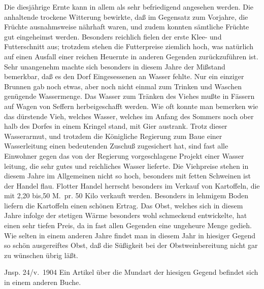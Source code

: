 

\pstart
Die diesjährige Ernte kann in allem als sehr\ob
befriedigend angesehen werden. Die anhaltende\ob
trockene Witterung bewirkte, daß im Gegensatz\ob
zum Vorjahre, die Früchte ausnahmsweise nährhaft\ob
waren, und zudem konnten sämtliche Früchte\ob
gut eingeheimst werden. Besonders reichlich fielen\ob
der erste Klee- und Futterschnitt aus; trotzdem\ob
stehen die Futterpreise ziemlich hoch, was natürlich\ob
auf einen Ausfall einer reichen Heuernte in\ob
anderen Gegenden zurückzuführen ist. Sehr\ob
unangenehm machte sich besonders in diesem\ob
Jahre der Mißstand bemerkbar, daß es den Dorf\ohb
Eingesessenen an Wasser fehlte. Nur ein\ob
einziger Brunnen gab noch etwas, aber noch\ob
nicht einmal zum Trinken und Waschen genügende\ob
Wassermenge. Das Wasser zum Tränken des Viehes\ob
mußte in Fässern auf Wagen von Seffern\ob
herbeigeschafft werden. Wie oft konnte man\ob
bemerken wie das dürstende Vieh, welches\ob
Wasser, welches im Anfang des Sommers noch ober\ohb
halb des Dorfes in einem Kringel stand, mit\ob
Gier austrank. Trotz dieser Wasserarmut, und trotzdem\ob
die Königliche Regierung zum Baue einer\ob
Wasserleitung einen bedeutenden Zuschuß zugesichert\ob
hat, sind fast alle Einwohner gegen das von\ob
der Regierung vorgeschlagene Projekt einer Wasser\ohb
leitung, die sehr gutes und reichliches Wasser lieferte.\ob
Die Viehpreise stehen in diesem Jahre im Allgemeinen\ob
nicht so hoch, besonders mit fetten Schweinen ist\ob
der Handel flau. Flotter Handel herrscht besonders\ob
im Verkauf von Kartoffeln, die mit 2,20 bis,50 M.\ pr. 50 Kilo verkauft werden. Besonders\ob
in lehmigem Boden liefern die Kartoffeln einen\ob
schönen Ertrag. Das Obst, welches sich in diesem\ob
Jahre infolge der stetigen Wärme besonders wohl\ohb
schmeckend entwickelte, hat einen sehr tiefen\ob
Preis, da in fast allen Gegenden eine ungeheure\ob
Menge gedieh. Wie selten in einem anderen Jahre\ob
findet man in diesem Jahr in hiesiger Gegend\ob
so schön ausgereiftes Obst, daß die Süßigkeit bei\ob
der Obstweinbereitung nicht gar zu wünschen übrig läßt.

Jnsp. 24/v.\ 1904\ob
Ein Artikel über die Mundart der hiesigen Gegend befindet sich in einem anderen Buche.
\pend
